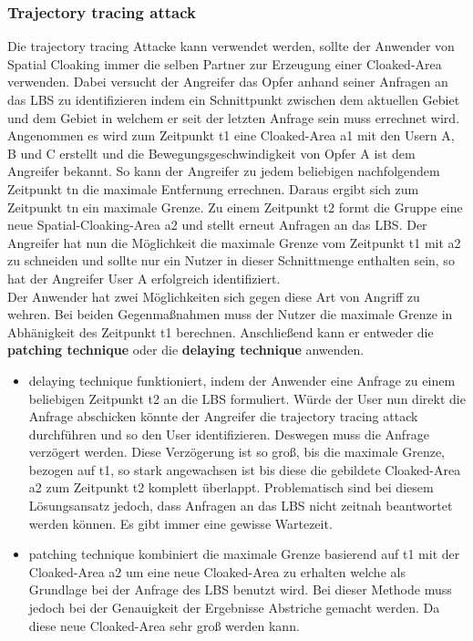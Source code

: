 \subsubsection{Trajectory tracing attack}
Die trajectory tracing Attacke kann verwendet werden, sollte der Anwender von Spatial Cloaking immer die selben Partner zur Erzeugung einer Cloaked-Area verwenden. Dabei versucht der Angreifer das Opfer anhand seiner Anfragen an das LBS zu identifizieren indem ein Schnittpunkt zwischen dem aktuellen Gebiet und dem Gebiet in welchem er seit der letzten Anfrage sein muss errechnet wird. Angenommen es wird zum Zeitpunkt t1 eine Cloaked-Area a1 mit den Usern A, B und C erstellt und die Bewegungsgeschwindigkeit von Opfer A ist dem Angreifer bekannt. So kann der Angreifer zu jedem beliebigen nachfolgendem Zeitpunkt tn die maximale Entfernung errechnen. Daraus ergibt sich zum Zeitpunkt tn ein maximale Grenze. Zu einem Zeitpunkt t2 formt die Gruppe eine neue Spatial-Cloaking-Area a2 und stellt erneut Anfragen an das LBS. Der Angreifer hat nun die Möglichkeit die maximale Grenze vom Zeitpunkt t1 mit a2 zu schneiden und sollte nur ein Nutzer in dieser Schnittmenge enthalten sein, so hat der Angreifer User A erfolgreich identifiziert.\\ 
Der Anwender hat zwei Möglichkeiten sich gegen diese Art von Angriff zu wehren. Bei beiden Gegenmaßnahmen muss der Nutzer die maximale Grenze in Abhänigkeit des Zeitpunkt t1 berechnen. Anschließend kann er entweder die \textbf{patching technique} oder die \textbf{delaying technique} anwenden.
\begin{itemize}

\item{delaying technique} funktioniert, indem der Anwender eine Anfrage zu einem beliebigen Zeitpunkt t2 an die LBS formuliert. Würde der User nun direkt die Anfrage abschicken könnte der Angreifer die trajectory tracing attack durchführen und so den User identifizieren. Deswegen muss die Anfrage verzögert werden. Diese Verzögerung ist so groß, bis die maximale Grenze, bezogen auf t1, so stark angewachsen ist bis diese die gebildete Cloaked-Area a2 zum Zeitpunkt t2 komplett überlappt. Problematisch sind bei diesem Lösungsansatz jedoch, dass Anfragen an das LBS nicht zeitnah beantwortet werden können. Es gibt immer eine gewisse Wartezeit.
\item{patching technique} kombiniert die maximale Grenze basierend auf t1 mit der Cloaked-Area a2 um eine neue Cloaked-Area zu erhalten welche als Grundlage bei der Anfrage des LBS benutzt wird. Bei dieser Methode muss jedoch bei der Genauigkeit der Ergebnisse Abstriche gemacht werden. Da diese neue Cloaked-Area sehr groß werden kann. 
\end{itemize}
